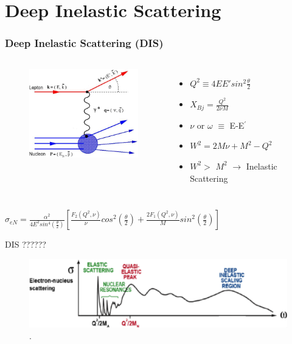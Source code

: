 \documentclass[12pt]{beamer}
\begin{document}
\section[DIS]{Deep Inelastic Scattering}
\begin{frame}
\frametitle{Deep Inelastic Scattering (DIS)}
\vspace*{-20pt}
\begin{columns}[c] %
	\begin{figure}
		\includegraphics[width =5cm]{../images/DIS.pdf}
	\end{figure}
	\begin{itemize}
		\item $ Q^2 \equiv 4EE' sin^2 \frac{\theta}{2} $
		\item $X_{Bj}= \frac{Q^2}{2\nu M}$
		\item $\nu$ or $\omega$ $\equiv$ E-E$^{\prime}$
		\item  $W^2 = 2M\nu + M^2 - Q^2$
		\item $W^2 >$ $M^2$ $\rightarrow$ Inelastic Scattering  
	\end{itemize}
\end{columns}
	\vspace*{10pt}
	\centering
	\Large	$\sigma_{eN} = \frac{\alpha^2}{4E^2sin^4(\frac{\theta}{2})} [\frac{F_2(Q^2,\nu)}{\nu}cos^2\left(\frac{\theta}{2}\right) + \frac{2F_1(Q^2,\nu)}{M}sin^2\left(\frac{\theta}{2}\right)] $	
\end{frame}

\begin{frame}
\begin{block}{DIS ??????}
	\begin{figure}[]
		\centering
		\includegraphics[width=12cm]{../images/Thesis/E_nucleus_spect.pdf}
		\vspace{20pt}
		\caption*{ \cite{spectrum}.}
		
	\end{figure}

\end{block}
\end{frame}
\end{document}

